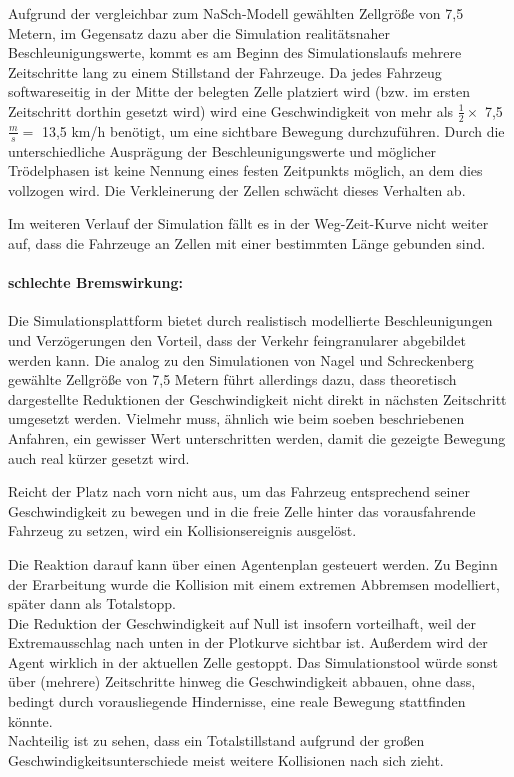 Aufgrund der vergleichbar zum NaSch-Modell gewählten Zellgröße von 7,5 Metern, im Gegensatz dazu aber die Simulation realitätsnaher Beschleunigungswerte, kommt es am Beginn des Simulationslaufs mehrere Zeitschritte lang zu einem Stillstand der Fahrzeuge.
Da jedes Fahrzeug softwareseitig in der Mitte der belegten Zelle platziert wird (bzw. im ersten Zeitschritt dorthin gesetzt wird) wird eine Geschwindigkeit von mehr als $ \frac{1}{2} \times $ 7,5 $ \frac{m}{s} = $ 13,5 km/h benötigt, um eine sichtbare Bewegung durchzuführen.
Durch die unterschiedliche Ausprägung der Beschleunigungswerte und möglicher Trödelphasen ist keine Nennung eines festen Zeitpunkts möglich, an dem dies vollzogen wird.
Die Verkleinerung der Zellen schwächt dieses Verhalten ab.

Im weiteren Verlauf der Simulation fällt es in der Weg-Zeit-Kurve nicht weiter auf, dass die Fahrzeuge an Zellen mit einer bestimmten Länge gebunden sind.



\paragraph{schlechte Bremswirkung:}
\label{sec:bremsverhalten}

Die Simulationsplattform bietet durch realistisch modellierte Beschleunigungen und Verzögerungen den Vorteil, dass der Verkehr feingranularer abgebildet werden kann.
Die analog zu den Simulationen von Nagel und Schreckenberg gewählte Zellgröße von 7,5 Metern führt allerdings dazu, dass theoretisch dargestellte Reduktionen der Geschwindigkeit nicht direkt in nächsten Zeitschritt umgesetzt werden.
Vielmehr muss, ähnlich wie beim soeben beschriebenen Anfahren, ein gewisser Wert unterschritten werden, damit die gezeigte Bewegung auch real kürzer gesetzt wird.

Reicht der Platz nach vorn nicht aus, um das Fahrzeug entsprechend seiner Geschwindigkeit zu bewegen und in die freie Zelle hinter das vorausfahrende Fahrzeug zu setzen, wird ein Kollisionsereignis ausgelöst.

Die Reaktion darauf kann über einen Agentenplan gesteuert werden.
Zu Beginn der Erarbeitung wurde die Kollision mit einem extremen Abbremsen modelliert, später dann als Totalstopp.
\\
Die Reduktion der Geschwindigkeit auf Null ist insofern vorteilhaft, weil der Extremausschlag nach unten in der Plotkurve sichtbar ist.
Außerdem wird der Agent wirklich in der aktuellen Zelle gestoppt. 
Das Simulationstool würde sonst über (mehrere) Zeitschritte hinweg die Geschwindigkeit abbauen, ohne dass, bedingt durch vorausliegende Hindernisse, eine reale Bewegung stattfinden könnte. 
\\
Nachteilig ist zu sehen, dass ein Totalstillstand aufgrund der großen Geschwindigkeitsunterschiede meist weitere Kollisionen nach sich zieht.

